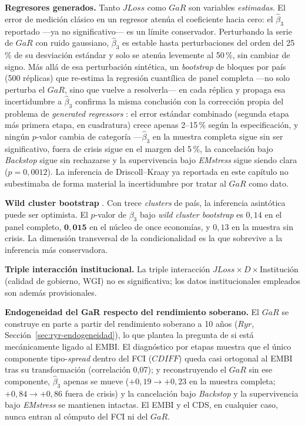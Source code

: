 \textbf{Regresores generados.} Tanto $JLoss$ como $GaR$ son variables \emph{estimadas}. El error de medición clásico en un regresor atenúa el coeficiente hacia cero: el $\hat\beta_3$ reportado —ya no significativo— es un límite conservador. Perturbando la serie de $GaR$ con ruido gaussiano, $\hat\beta_3$ es estable hasta perturbaciones del orden del 25\,\% de su desviación estándar y solo se atenúa levemente al 50\,\%, sin cambiar de signo. Más allá de esa perturbación sintética, un \textit{bootstrap} de bloques por país (500 réplicas) que re-estima la regresión cuantílica de panel completa —no solo perturba el $GaR$, sino que vuelve a resolverla— en cada réplica y propaga esa incertidumbre a $\hat\beta_3$ confirma la misma conclusión con la corrección propia del problema de \textit{generated regressors} \citep{Pagan1984}: el error estándar combinado (segunda etapa más primera etapa, en cuadratura) crece apenas 2--15\,\% según la especificación, y ningún $p$-valor cambia de categoría —$\hat\beta_3$ en la muestra completa sigue sin ser significativo, fuera de crisis sigue en el margen del 5\,\%, la cancelación bajo \textit{Backstop} sigue sin rechazarse y la supervivencia bajo \textit{EMstress} sigue siendo clara ($p=0{,}0012$). La inferencia de Driscoll--Kraay ya reportada en este capítulo no subestimaba de forma material la incertidumbre por tratar al $GaR$ como dato.

\textbf{Wild cluster bootstrap} \citep{CameronGelbachMiller2008}. Con trece \textit{clusters} de país, la inferencia asintótica puede ser optimista. El $p$-valor de $\beta_3$ bajo \textit{wild cluster bootstrap} es $0{,}14$ en el panel completo, $\mathbf{0{,}015}$ en el núcleo de once economías, y $0{,}13$ en la muestra sin crisis. La dimensión transversal de la condicionalidad es la que sobrevive a la inferencia más conservadora.

\textbf{Triple interacción institucional.} La triple interacción $JLoss\times D\times$Institución (calidad de gobierno, WGI) no es significativa; los datos institucionales empleados son además provisionales.

\textbf{Endogeneidad del GaR respecto del rendimiento soberano.} El $GaR$ se construye en parte a partir del rendimiento soberano a 10 años ($Ryr$, Sección~\ref{sec:ryr-endogeneidad}), lo que plantea la pregunta de si está mecánicamente ligado al EMBI. El diagnóstico por etapas muestra que el único componente tipo-\textit{spread} dentro del FCI ($CDIFF$) queda casi ortogonal al EMBI tras su transformación (correlación 0,07); y reconstruyendo el $GaR$ sin ese componente, $\hat\beta_3$ apenas se mueve ($+0{,}19\to+0{,}23$ en la muestra completa; $+0{,}84\to+0{,}86$ fuera de crisis) y la cancelación bajo \textit{Backstop} y la supervivencia bajo \textit{EMstress} se mantienen intactas. El EMBI y el CDS, en cualquier caso, nunca entran al cómputo del FCI ni del $GaR$.

